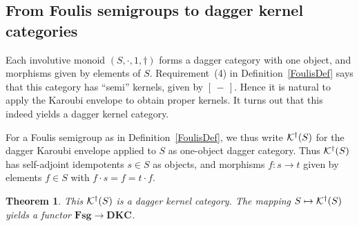 \documentclass{article}
\newtheorem{theorem}{Theorem}
\newcommand{\Cat}[1]{\ensuremath{\mathbf{#1}}}
\newcommand{\dagKaroubi}[1]{{\cal K}^{\dag}(#1)}
\newcommand{\sai}[1]{[\,#1\,]}
\begin{document}
\subsection{From Foulis semigroups to dagger kernel categories}

Each involutive monoid $(S, \cdot, 1, \dag)$ forms a dagger category
with one object, and morphisms given by elements of
$S$. Requirement~(4) in Definition~\ref{FoulisDef} says that this
category has ``semi'' kernels, given by $\sai{-}$. Hence it is natural
to apply the Karoubi envelope to obtain proper kernels. It turns out
that this indeed yields a dagger kernel category.

For a Foulis semigroup as in Definition~\ref{FoulisDef}, we thus write
$\dagKaroubi{S}$ for the dagger Karoubi envelope applied to $S$ as
one-object dagger category. Thus $\dagKaroubi{S}$ has self-adjoint
idempotents $s\in S$ as objects, and morphisms $f\colon s\rightarrow
t$ given by elements $f\in S$ with $f\cdot s = f = t\cdot f$.



\begin{theorem}
\label{Foulis2DagKerThm}
This $\dagKaroubi{S}$ is a dagger kernel category. The mapping
$S\mapsto \dagKaroubi{S}$ yields a functor $\Cat{Fsg} \rightarrow
\Cat{DKC}$.
\end{theorem}
\end{document}
